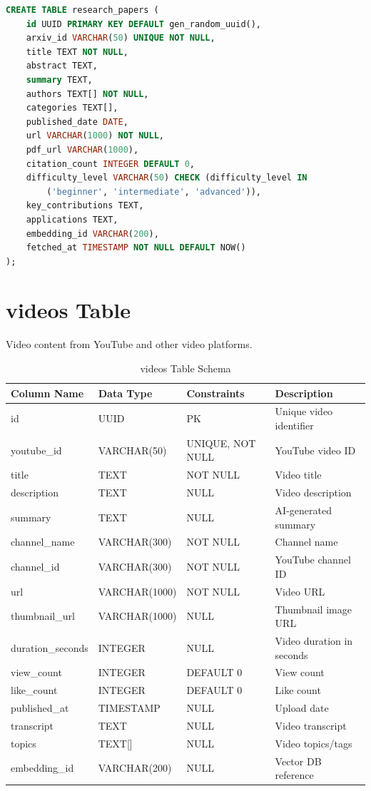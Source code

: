 \documentclass[12pt,a4paper]{report}
\begin{document}
\begin{lstlisting}[language=SQL,basicstyle=\ttfamily\small]
CREATE TABLE research_papers (
    id UUID PRIMARY KEY DEFAULT gen_random_uuid(),
    arxiv_id VARCHAR(50) UNIQUE NOT NULL,
    title TEXT NOT NULL,
    abstract TEXT,
    summary TEXT,
    authors TEXT[] NOT NULL,
    categories TEXT[],
    published_date DATE,
    url VARCHAR(1000) NOT NULL,
    pdf_url VARCHAR(1000),
    citation_count INTEGER DEFAULT 0,
    difficulty_level VARCHAR(50) CHECK (difficulty_level IN 
        ('beginner', 'intermediate', 'advanced')),
    key_contributions TEXT,
    applications TEXT,
    embedding_id VARCHAR(200),
    fetched_at TIMESTAMP NOT NULL DEFAULT NOW()
);
\end{lstlisting}

\newpage
\section{videos Table}

Video content from YouTube and other video platforms.

\begin{table}[h]
\centering
\small
\caption{videos Table Schema}
\begin{tabular}{|l|l|l|l|}
\toprule
\textbf{Column Name} & \textbf{Data Type} & \textbf{Constraints} & \textbf{Description} \\
\midrule
id & UUID & PK & Unique video identifier \\
youtube\_id & VARCHAR(50) & UNIQUE, NOT NULL & YouTube video ID \\
title & TEXT & NOT NULL & Video title \\
description & TEXT & NULL & Video description \\
summary & TEXT & NULL & AI-generated summary \\
channel\_name & VARCHAR(300) & NOT NULL & Channel name \\
channel\_id & VARCHAR(300) & NOT NULL & YouTube channel ID \\
url & VARCHAR(1000) & NOT NULL & Video URL \\
thumbnail\_url & VARCHAR(1000) & NULL & Thumbnail image URL \\
duration\_seconds & INTEGER & NULL & Video duration in seconds \\
view\_count & INTEGER & DEFAULT 0 & View count \\
like\_count & INTEGER & DEFAULT 0 & Like count \\
published\_at & TIMESTAMP & NULL & Upload date \\
transcript & TEXT & NULL & Video transcript \\
topics & TEXT[] & NULL & Video topics/tags \\
embedding\_id & VARCHAR(200) & NULL & Vector DB reference \\
\bottomrule
\end{tabular}
\end{table}
\end{document}
